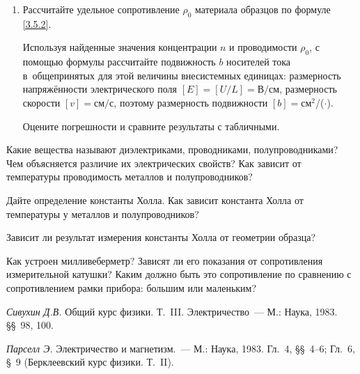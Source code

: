 \begin{lab:task}
\begin{enumerate}
{Для цинка изобразите на графике зависимость $V_{xy}=f(B)$ и по наклону прямой рассчитайте постоянную Холла.

Для обоих образцов рассчитайте концентрацию $n$ носителей тока по формуле .

Оцените погрешности и сравните результаты с табличными.}

\item{ Рассчитайте удельное сопротивление $\rho_0$ материала образцов по формуле \eqref{3.5.2}.

Используя найденные значения концентрации $n$ и проводимости $\rho_0$, с помощью формулы  рассчитайте подвижность $b$ носителей тока в~общепринятых для этой величины внесистемных единицах: размерность напряжённости электрического поля $[E] = [U/L]=\text{В/см}$, размерность скорости $[v]=\text{см/с}$, поэтому размерность подвижности $[b]=$см$^2$/($\cdot$).

Оцените погрешности и сравните результаты с табличными.
}
\end{enumerate}

\end{lab:task}

\begin{lab:questions}

\item{ Какие вещества называют диэлектриками, проводниками, полупроводниками? Чем объясняется различие их электрических свойств? Как зависит от температуры проводимость металлов и полупроводников?}

\item{ Дайте определение константы Холла. Как зависит константа Холла от температуры у металлов и полупроводников?}

\item{ Зависит ли результат измерения константы Холла от геометрии образца?}

\item{ Как устроен милливеберметр? Зависят ли его показания от сопротивления измерительной катушки? Каким должно быть это сопротивление по сравнению с сопротивлением рамки прибора: большим или маленьким?}

\end{lab:questions}

\begin{lab:literature}

\item{ \emph{Сивухин Д.В.} Общий курс физики. Т.~III. Электричество~--- М.: Наука, 1983. \S\S~98, 100.}

\item{ \emph{Парселл Э.} Электричество и магнетизм.~--- М.: Наука, 1983. Гл.~4, \S\S~4--6; Гл.~6, \S~9 (Берклеевский курс физики. Т.~II).}
\end{lab:literature}